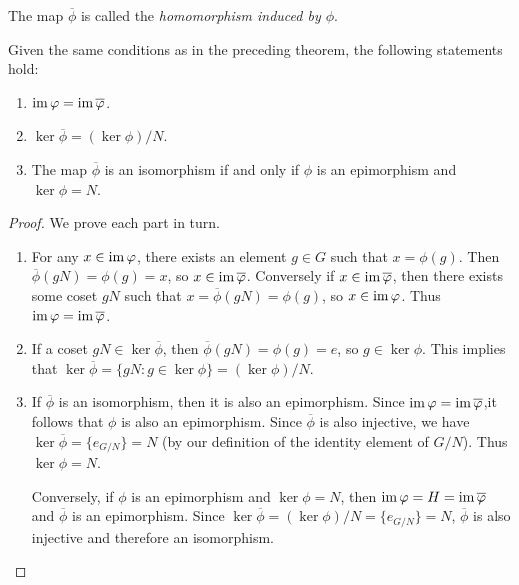 \begin{remark}
    The map \(\overline{\phi}\) is called the \emph{homomorphism induced by
    \(\phi\)}.
\end{remark}

\begin{theorem}
    Given the same conditions as in the preceding theorem, the following
    statements hold:
    \begin{enumerate}[label=(\alph*)]
        \item \(\operatorname{im} \varphi = \operatorname{im} \overline{\varphi}\).
        \item \(\ker \overline{\phi} = (\ker \phi)/N\).
        \item The map \(\overline{\phi}\) is an isomorphism if and only if
        \(\phi\) is an epimorphism and \(\ker \phi = N\).
    \end{enumerate}
\end{theorem}

\begin{proof}
    We prove each part in turn.

    \begin{enumerate}[label=(\alph*), wide]
        \item For any \(x \in \operatorname{im} \varphi\), there exists an element \(g \in G\)
        such that \(x = \phi(g)\). Then \(\overline{\phi}(gN) = \phi(g) = x\),
        so \(x \in \operatorname{im} \overline{\varphi}\). Conversely if \(x \in \operatorname{im}
        \overline{\varphi}\), then there exists some coset \(gN\) such that \(x =
        \overline{\phi}(gN) = \phi(g)\), so \(x \in \operatorname{im} \varphi\). Thus \(\operatorname{im}
        \varphi = \operatorname{im} \overline{\varphi}\).
        
        \item If a coset \(gN \in \ker \overline{\phi}\), then
        \(\overline{\phi}(gN) = \phi(g) = e\), so \(g \in \ker \phi\). This
        implies that \(\ker \overline{\phi} = \{gN : g \in \ker \phi\} = (\ker
        \phi)/N\).
        
        \item If \(\overline{\phi}\) is an isomorphism, then it is also an
        epimorphism. Since \(\operatorname{im} \varphi = \operatorname{im} \overline{\varphi}\),it follows that
        \(\phi\) is also an epimorphism. Since \(\overline{\phi}\) is also
        injective, we have \(\ker \overline{\phi} = \{e_{G/N}\} = N\) (by our
        definition of the identity element of \(G/N\)). Thus \(\ker \phi = N\).
        
        Conversely, if \(\phi\) is an epimorphism and \(\ker \phi = N\), then
        \(\operatorname{im} \varphi = H = \operatorname{im} \overline{\varphi}\) and \(\overline{\phi}\) is an
        epimorphism. Since \(\ker \overline{\phi} = (\ker \phi)/N = \{e_{G/N}\}
        = N\), \(\overline{\phi}\) is also injective and therefore an
        isomorphism.
    \end{enumerate}
\end{proof}

